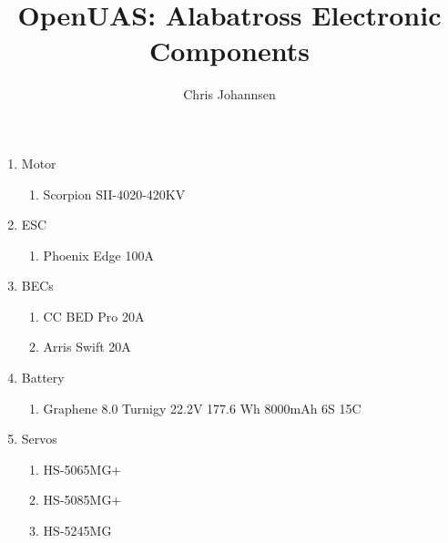 \documentclass{article}
\begin{document}
\title{OpenUAS: Alabatross Electronic Components}

\author{Chris Johannsen}

\maketitle

\begin{enumerate}

\item Motor

\begin{enumerate}
\item Scorpion SII-4020-420KV\\
\end{enumerate}

\item ESC\\

\begin{enumerate}
\item Phoenix Edge 100A\\
\end{enumerate}

\item BECs\\

\begin{enumerate}
\item CC BED Pro 20A\\
\item Arris Swift 20A
\end{enumerate}

\item Battery\\

\begin{enumerate}
\item Graphene 8.0 Turnigy 22.2V 177.6 Wh 8000mAh 6S 15C\\
\end{enumerate}

\item Servos\\

\begin{enumerate}
\item HS-5065MG+\\
\item HS-5085MG+\\
\item HS-5245MG\\
\end{enumerate}


\end{enumerate}
\end{document}
